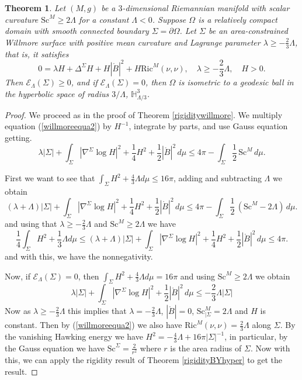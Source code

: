 \documentclass[12pt,a4paper]{amsart}
\theoremstyle{plain}
\newtheorem{theorem}{Theorem}[section]
\theoremstyle{definition}
\begin{document}
\begin{theorem}\label{rigiditywillhyper}
     Let $(M,g)$ be a  $3$-dimensional Riemannian  manifold with scalar curvature $\mathrm{Sc}^M \geq 2 \Lambda  $ for a constant $\Lambda < 0$. Suppose $\Omega$ is a relatively compact domain with smooth connected boundary  $\Sigma=  \partial \Omega $.  Let $\Sigma $ be an area-constrained Willmore surface with positive mean curvature and  Lagrange parameter $\lambda  \geq -\frac{2}{3}\Lambda$, that is, it  satisfies
\begin{equation}\label{willmoreequa2}
        0= \lambda H  +\Delta^\Sigma H + H|\mathring{B}|^2+ H \mathrm{Ric}^M(\nu, \nu), \quad \lambda  \geq -\frac{2}{3}\Lambda, \quad H>0.
    \end{equation}
   Then $\mathcal{E}_\Lambda(\Sigma)\ge0$, and if $\mathcal{E}_\Lambda(\Sigma)=0$,  then  $\Omega$ is isometric to a geodesic ball in the hyperbolic space of radius $3/\Lambda$, $\mathbb{H}^3_{\Lambda/3}$.
\end{theorem}
\begin{proof}
We proceed as in the proof of Theorem \ref{rigiditywillmore}.
We  multiply equation (\ref{willmoreequa2}) by \( H^{-1} \), integrate  by parts, and use Gauss equation getting. 
\[
\lambda |\Sigma | + \int_{\Sigma} |\nabla^{\Sigma}  \log H|^2 + \frac{1}{4} H^2 + \frac{1}{2} |\mathring{B}|^2  \, d\mu \leq 4\pi - \int_{\Sigma } \frac{1}{2} \, \mathrm{Sc}^M \, d\mu.
\]   

First we want to see that $\int_{\Sigma } H^2+\frac{4}{3} \Lambda d\mu  \leq 16 \pi   $, adding and subtracting $\Lambda$ we obtain  
\[
(\lambda +\Lambda )|\Sigma |   + \int_{\Sigma} |\nabla^{\Sigma}  \log H|^2 + \frac{1}{4} H^2 + \frac{1}{2} |\mathring{B}|^2  \, d\mu \leq 4\pi - \int_{\Sigma } \frac{1}{2} \, (\mathrm{Sc}^M -2 \Lambda )\, d\mu.
\]   
and using that $ \lambda  \geq -\frac{2}{3}\Lambda $ and  $\mathrm{Sc}^M \geq 2 \Lambda  $ we have
\[
 \frac{1}{4}\int_{\Sigma } H^2+\frac{1}{3} \Lambda d\mu \leq (\lambda +\Lambda )|\Sigma |   + \int_{\Sigma} |\nabla^{\Sigma}  \log H|^2 + \frac{1}{4} H^2 + \frac{1}{2} |\mathring{B}|^2  \, d\mu \leq 4\pi .
\]   
and with this, we have the nonnegativity. 

Now, if $\mathcal{E}_\Lambda(\Sigma)=0$, then   $\int_{\Sigma } H^2+\frac{4}{3} \Lambda d\mu =16 \pi   $ and using $\mathrm{Sc}^M \geq 2 \Lambda  $ we obtain 
$$\lambda |\Sigma | + \int_{\Sigma} |\nabla^{\Sigma}  \log H|^2  + \frac{1}{2} |\mathring{B}|^2  \, d\mu \leq -\frac{2}{3}\Lambda |\Sigma| $$
 Now as $\lambda  \geq -\frac{2}{3}\Lambda$ 
 this implies that $\lambda  = -\frac{2}{3}\Lambda$, $|\mathring{B}|  = 0 $, $\mathrm{Sc}^M_{| \Sigma} = 2 \Lambda$ and $H$ is constant. Then by (\ref{willmoreequa2}) we also have $ \mathrm{Ric}^M(\nu, \nu)=\frac{2}{3}\Lambda$ along $\Sigma $. By the vanishing Hawking energy we have $H^2 = -\frac{4}{3}\Lambda  + 16 \pi |\Sigma|^{-1} $, in particular, by the Gauss equation we have $ \mathrm{Sc}^{\Sigma} = \frac{2}{r^2}$ where $r$ is the area radius of $\Sigma$.  Now with this, we can apply the rigidity result of Theorem \ref{rigidityBYhyper} to get the result.    
\end{proof}
\end{document}
